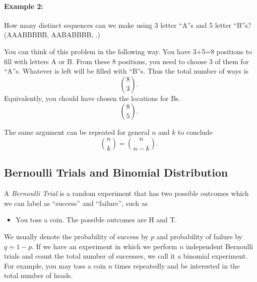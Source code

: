 \paragraph{Example 2:} How many distinct sequences can we make using 3 letter ``A''s and 5 letter ``B''s? (AAABBBBB, AABABBBB, \etc.)

You can think of this problem in the following way. You have 3+5=8 positions to fill with letters A or B. From these 8 positions, you need to choose 3 of them for ``A''s. Whatever is left will be filled with ``B''s. Thus the total number of ways is 
$$\binom{8}{3}.$$
Equivalently, you chould have chosen the locations for Bs. 
$$\binom{8}{5}.$$

The same argument can be repeated for general $n$ and $k$ to conclude
$$\binom{n}{k}=\binom{n}{n-k}.$$

\subsection{Bernoulli Trials and Binomial Distribution}
A \textit{Bernoulli Trial} is a random experiment that has two possible outcomes which we can label as ``success'' and ``failure'', such as
\begin{itemize}
	\item You toss a coin. The possible outcomes are H and T. 
\end{itemize}
We usually denote the probability of success by $p$ and probability of failure by $q=1-p$. If we have an experiment in which we perform $n$ independent Bernoulli trials and count the total number of successes, we call it a binomial experiment. For example, you may toss a coin $n$ times repeatedly and be interested in the total number of heads.

